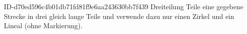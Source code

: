 \begin{exercise}
      {ID-d70ed596c4b01db71fd81f9e6aa243630bb7f439}
      {Dreiteilung}
  \ifproblem\problem
    Teile eine gegebene Strecke in drei gleich lange Teile und
    verwende dazu nur einen Zirkel und ein Lineal (ohne Markierung).
  \fi
\end{exercise}
